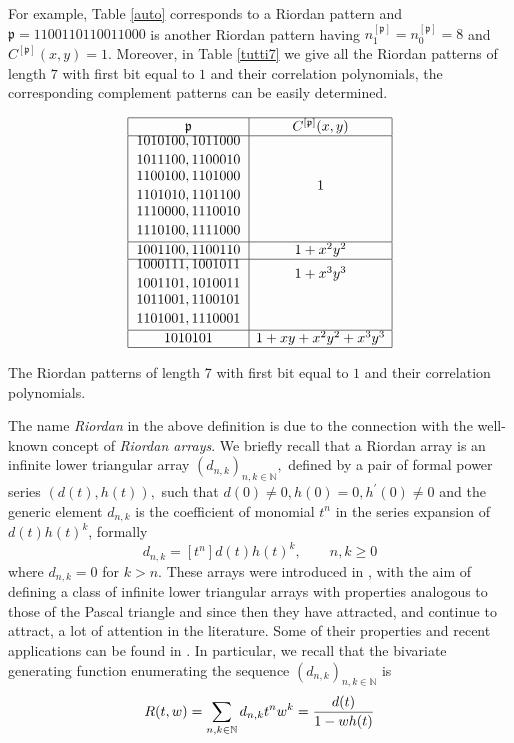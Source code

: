 For example, Table \ref{auto} corresponds to a Riordan pattern and
$\mathfrak{p}= 1100110110011000$ is another Riordan pattern having
$n_1^{[\mathfrak{p}]}=n_0^{[\mathfrak{p}]}=8$ and $C^{[\mathfrak{p}]}(x,y)=1.$
Moreover, in Table \ref{tutti7} we give all the Riordan  patterns of length $7$
with first bit equal to $1$ and their correlation polynomials, the
corresponding complement patterns can be easily determined.
\begin{table}
$$
{\displaystyle
\begin{array}{|c|c|}
  \hline
  \mathfrak{p} & C^{[\mathfrak{p}]}(x,y)\\
  \hline
{\displaystyle {1010100, 1011000 \atop 1011100, 1100010}} & \\  [0.3cm]
{\displaystyle {1100100, 1101000 \atop 1101010, 1101100}} &  1\\  [0.3cm]
{\displaystyle {1110000, 1110010 \atop 1110100, 1111000}} & \\  [0.3cm] \hline
1001100, 1100110 &  1+x^2y^2 \\ \hline
{\displaystyle {1000111, 1001011 \atop 1001101, 1010011 }} & 1+x^3y^3 \\  [0.3cm]
{\displaystyle {1011001, 1100101 \atop 1101001, 1110001}} &  \\  [0.3cm] \hline
1010101 &  1+xy+x^2y^2+x^3y^3 \\ \hline
\end{array}
}
$$
\caption{\label{tutti7}The Riordan patterns of length 7 with first bit equal to
$1$ and their correlation polynomials.}
\end{table}



The name \textit{Riordan} in the above definition is due to the connection with
the well-known concept of \textit{Riordan arrays}.  We briefly recall that a
Riordan array is an infinite lower triangular array  $(d_{n,k} )_{n,k \in
\mathbb{N}},$ defined by a pair of formal power series $(d(t),h(t)),$ such that
$d(0)\neq 0, h(0)=0, h^\prime(0)\neq0$ and the generic element $d_{n,k}$ is the
coefficient of monomial $t^{n}$ in the series expansion of $d(t)h(t)^{k}$, formally
\begin{displaymath}
    d_{n,k}=[t^n]d(t)h(t)^k, \qquad n,k \geq 0
\end{displaymath}
where $d_{n,k}=0$ for $k>n.$ These arrays were introduced in
\citep{SHAPIRO1991229}, with the aim of defining a class of infinite lower
triangular arrays with properties analogous to those of the Pascal triangle and
since then they have attracted, and continue to attract, a lot of attention in
the literature. Some of their properties  and recent applications can be found
in \citep{LUZON201475,MRSV97}. In particular, we recall that the bivariate generating
function enumerating the sequence $(d_{n,k} )_{n,k \in\mathbb{N}}$ is
\begin{equation}
    \label{bgf}
    R(t,w) = \sum_{n,k \in\mathbb{N}}{d_{n,k} t^n w^k} = {d(t) \over 1-wh(t)}
\end{equation}

